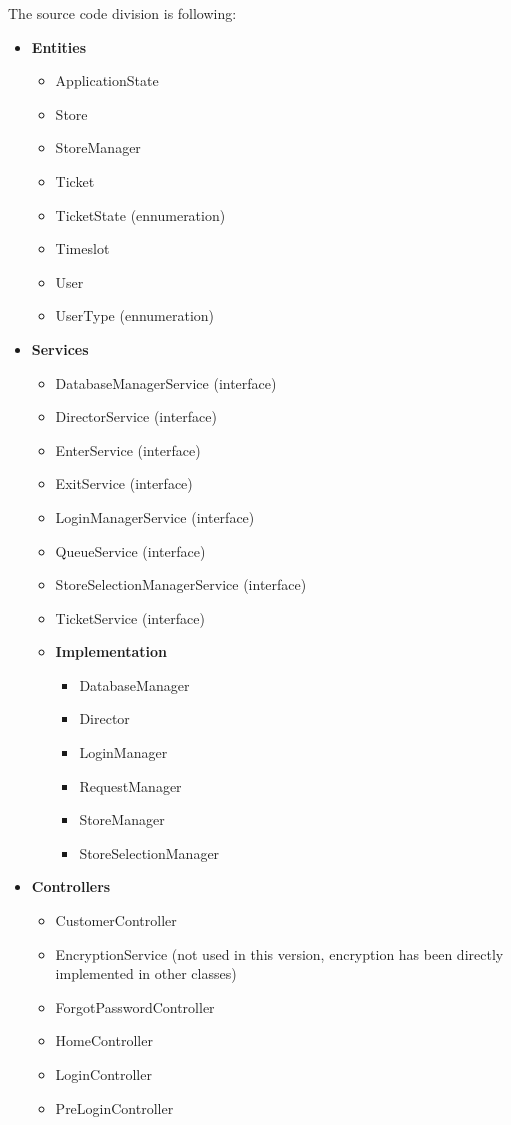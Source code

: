The source code division is following:
\begin{itemize}
\item \textbf{Entities}
\begin{itemize}
\item ApplicationState
\item Store
\item StoreManager
\item Ticket
\item TicketState (ennumeration)
\item Timeslot
\item User
\item UserType (ennumeration)
\end{itemize}
\item \textbf{Services}
\begin{itemize}
\item DatabaseManagerService (interface)
\item DirectorService (interface)
\item EnterService (interface)
\item ExitService (interface)
\item LoginManagerService (interface)
\item QueueService (interface)
\item StoreSelectionManagerService (interface)
\item TicketService (interface)
\item \textbf{Implementation}
\begin{itemize}
\item DatabaseManager
\item Director
\item LoginManager
\item RequestManager
\item StoreManager
\item StoreSelectionManager
\end{itemize}
\end{itemize}
\item \textbf{Controllers}
\begin{itemize}
\item CustomerController
\item EncryptionService (not used in this version, encryption has been directly implemented in other classes)
\item ForgotPasswordController
\item HomeController
\item LoginController
\item PreLoginController

\end{itemize}
\end{itemize}
